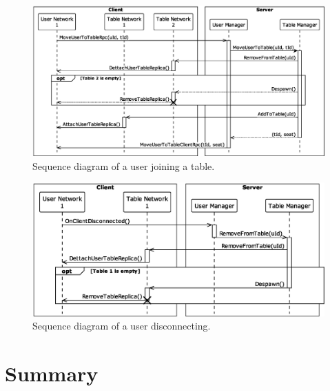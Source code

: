         \begin{figure}[h]
            \centering
            \includegraphics[width=.9\linewidth]{diagrams/out/table_join.eps}
            \caption{Sequence diagram of a user joining a table.}
            \label{fig:table_join}
        \end{figure}

        \begin{figure}[h]
            \centering
            \includegraphics[width=.9\linewidth]{diagrams/out/disconnect.eps}
            \caption{Sequence diagram of a user disconnecting.}
            \label{fig:disconnect}
        \end{figure}





\section{Summary}


